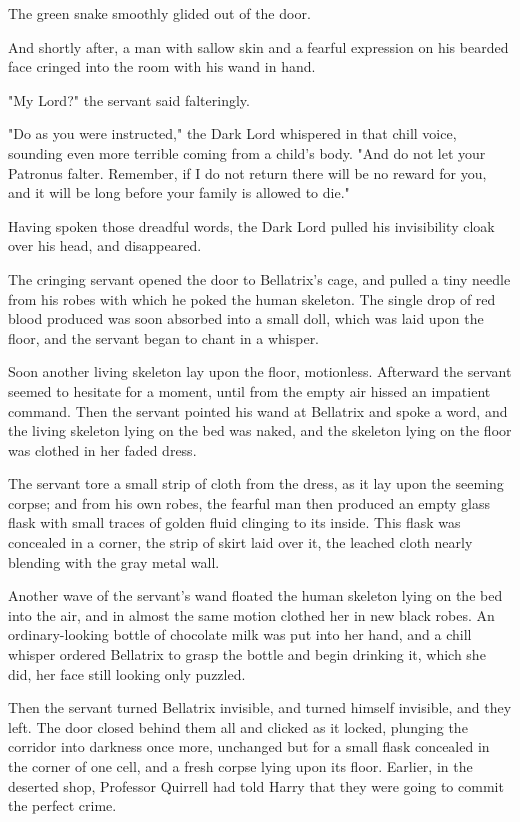 The green snake smoothly glided out of the door.

And shortly after, a man with sallow skin and a fearful expression on his bearded face cringed into the room with his wand in hand.

"My Lord?" the servant said falteringly.

"Do as you were instructed," the Dark Lord whispered in that chill voice, sounding even more terrible coming from a child's body. "And do not let your Patronus falter. Remember, if I do not return there will be no reward for you, and it will be long before your family is allowed to die."

Having spoken those dreadful words, the Dark Lord pulled his invisibility cloak over his head, and disappeared.

The cringing servant opened the door to Bellatrix's cage, and pulled a tiny needle from his robes with which he poked the human skeleton. The single drop of red blood produced was soon absorbed into a small doll, which was laid upon the floor, and the servant began to chant in a whisper.

Soon another living skeleton lay upon the floor, motionless. Afterward the servant seemed to hesitate for a moment, until from the empty air hissed an impatient command. Then the servant pointed his wand at Bellatrix and spoke a word, and the living skeleton lying on the bed was naked, and the skeleton lying on the floor was clothed in her faded dress.

The servant tore a small strip of cloth from the dress, as it lay upon the seeming corpse; and from his own robes, the fearful man then produced an empty glass flask with small traces of golden fluid clinging to its inside. This flask was concealed in a corner, the strip of skirt laid over it, the leached cloth nearly blending with the gray metal wall.

Another wave of the servant's wand floated the human skeleton lying on the bed into the air, and in almost the same motion clothed her in new black robes. An ordinary-looking bottle of chocolate milk was put into her hand, and a chill whisper ordered Bellatrix to grasp the bottle and begin drinking it, which she did, her face still looking only puzzled.

Then the servant turned Bellatrix invisible, and turned himself invisible, and they left. The door closed behind them all and clicked as it locked, plunging the corridor into darkness once more, unchanged but for a small flask concealed in the corner of one cell, and a fresh corpse lying upon its floor.
\sbreak
Earlier, in the deserted shop, Professor Quirrell had told Harry that they were going to commit the perfect crime.

